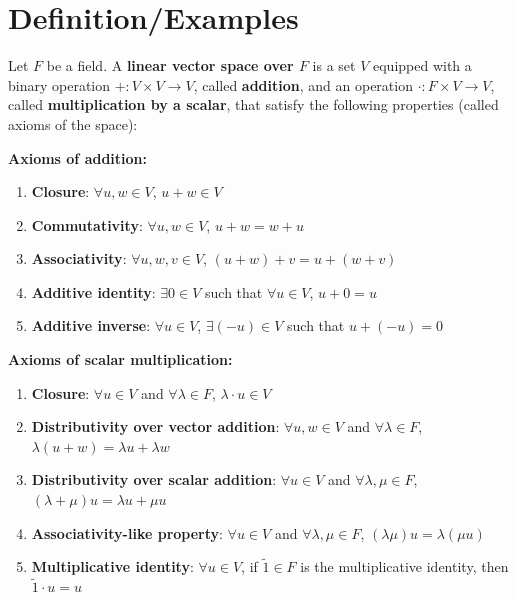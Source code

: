 \section{Definition/Examples}


\begin{definition}\label{def:vector-space}
    Let $F$ be a field. A \textbf{linear vector space over $F$} is a set $V$ equipped with a binary operation $+: V \times V \to V$, called \textbf{addition}, and an operation $\cdot: F \times V \to V$, called \textbf{multiplication by a scalar}, that satisfy the following properties (called axioms of the space):
    
    \textbf{Axioms of addition:}
    \begin{enumerate}[label=\roman*.]
        \item \textbf{Closure}: $\forall u, w \in V$, $u + w \in V$
        \item \textbf{Commutativity}: $\forall u, w \in V$, $u + w = w + u$
        \item \textbf{Associativity}: $\forall u, w, v \in V$, $(u + w) + v = u + (w + v)$
        \item \textbf{Additive identity}: $\exists 0 \in V$ such that $\forall u \in V$, $u + 0 = u$
        \item \textbf{Additive inverse}: $\forall u \in V$, $\exists (-u) \in V$ such that $u + (-u) = 0$
    \end{enumerate}
    
    \textbf{Axioms of scalar multiplication:}
    \begin{enumerate}[label=\roman*., resume]
        \item \textbf{Closure}: $\forall u \in V$ and $\forall \lambda \in F$, $\lambda \cdot u \in V$
        \item \textbf{Distributivity over vector addition}: $\forall u, w \in V$ and $\forall \lambda \in F$, $\lambda(u + w) = \lambda u + \lambda w$
        \item \textbf{Distributivity over scalar addition}: $\forall u \in V$ and $\forall \lambda, \mu \in F$, $(\lambda + \mu)u = \lambda u + \mu u$
        \item \textbf{Associativity-like property}: $\forall u \in V$ and $\forall \lambda, \mu \in F$, $(\lambda\mu)u = \lambda(\mu u)$
        \item \textbf{Multiplicative identity}: $\forall u \in V$, if $\tilde{1} \in F$ is the multiplicative identity, then $\tilde{1} \cdot u = u$
    \end{enumerate}
\end{definition}

